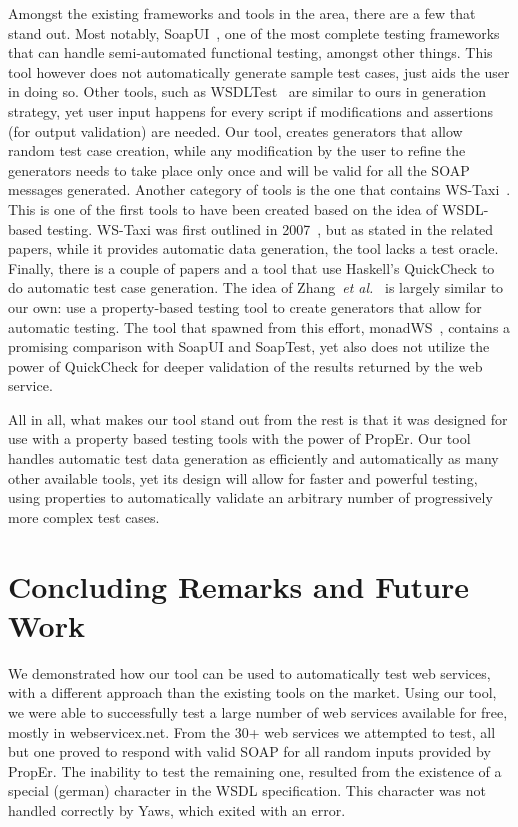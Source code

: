 \documentclass[copyright]{eptcs}
\begin{document}
Amongst the existing frameworks and tools in the area, there are a few that 
stand out. 
Most notably, SoapUI~\cite{soapUI}, one of the most complete testing frameworks
that can handle semi-automated functional testing, amongst other things. This 
tool however does not automatically generate sample test cases, just aids the
user in doing so.
Other tools, such as WSDLTest~\cite{wsdltest@IEEE06} are similar to ours in 
generation strategy, yet user input happens for every script if modifications 
and assertions (for output validation) are needed. Our tool, creates generators 
that allow random test case creation, while any modification by the user to
refine the generators needs to take place only once and will be valid for all
the SOAP messages generated.
Another category of tools is the one that contains WS-Taxi~\cite{taxi@IC-08}. 
This is one of the first tools to have been created based on the idea
of WSDL-based testing. WS-Taxi was first outlined in
2007~\cite{partition@AST-07}, but as stated in the related papers,
while it provides automatic data generation, the tool lacks a test oracle.
%
Finally, there is a couple of papers and a tool that use Haskell's
QuickCheck to do automatic test case generation. The idea of
Zhang~\textit{et al.}~\cite{ws_quickcheck} is largely similar to our
own: use a property-based testing tool to create generators that allow
for automatic testing. The tool that spawned from this effort,
monadWS~\cite{monadWS@AST-11}, contains a promising comparison with
SoapUI and SoapTest, yet also does not utilize the power of QuickCheck
for deeper validation of the results returned by the web service.

All in all, what makes our tool stand out from the rest is that it 
was designed for use with a property based testing tools with the 
power of PropEr. Our tool handles automatic test data generation as
efficiently and automatically as many other available tools, yet its
design will allow for faster and powerful testing, using properties 
to automatically validate an arbitrary number of progressively more 
complex test cases.

\section{Concluding Remarks and Future Work}

We demonstrated how our tool can be used to automatically test web services, 
with a different approach than the existing tools on the market. Using our 
tool, we were able to successfully test a large number of web services 
available for free, mostly in webservicex.net. From the 30+ web services we 
attempted to test, all but one proved to respond with valid SOAP for all random 
inputs provided by PropEr. The inability to test the remaining one, resulted 
from the existence of a special (german) character in the WSDL specification.
This character was not handled correctly by Yaws, which exited with an error. 
\end{document}
